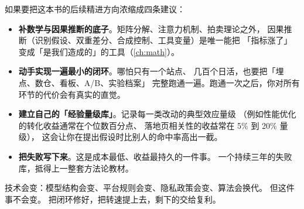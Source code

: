如果要把这本书的后续精进方向浓缩成四条建议：

\begin{itemize}
  \item \textbf{补数学与因果推断的底子}。矩阵分解、注意力机制、拍卖理论之外，
        因果推断（识别假设、双重差分、合成控制、工具变量）是唯一能把
        「指标涨了」变成「是我们造成的」的工具（\cref{ch:math}）。
  \item \textbf{动手实现一遍最小的闭环}。哪怕只有一个站点、
        几百个日活，也要把「埋点、数仓、看板、A/B、实验档案」
        完整跑通一遍。跑通一次之后，你对所有环节的代价会有真实的直觉。
  \item \textbf{建立自己的「经验量级库」}。记录每一类改动的典型效应量级
        （例如性能优化的转化收益通常在个位数百分点、
        落地页相关性的收益常在 5\% 到 20\% 量级），
        这会让你在提出假设时比别人的命中率高出一截。
  \item \textbf{把失败写下来}。这是成本最低、收益最持久的一件事。
        一个持续三年的失败库，抵得上一整套方法论教材。
\end{itemize}

技术会变：模型结构会变、平台规则会变、隐私政策会变、算法会换代。
但这件事不会变。
把闭环修好，把转速提上去，剩下的交给复利。
